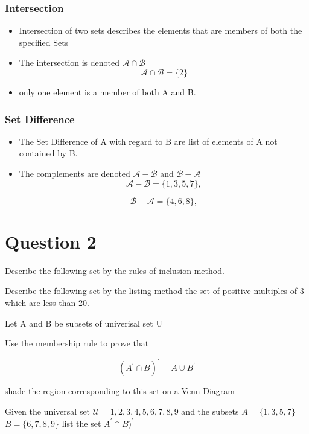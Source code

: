 
\subsubsection*{Intersection}
\begin{itemize}

\item Intersection of two sets describes the elements that are members of both the specified Sets

\item The intersection is denoted $\mathcal{A\cap B}$ 
\[ \mathcal{A\cap B} = \{2\}\]

\item only one element is a member of both A and B.
\end{itemize}

\subsubsection*{Set Difference}
\begin{itemize}

\item The Set Difference of A with regard to B are list of elements of A not contained by B.

\item The complements are denoted $\mathcal{A-B}$ and $\mathcal{B-A}$
\[ \mathcal{A-B} = \{1,3,5,7\}, \]

\[ \mathcal{B-A} = \{4,6,8\}, \]
\end{itemize}



\section*{Question 2}
Describe the following set by the rules of inclusion method.

Describe the following set by the listing method
the set of positive multiples of 3 which are less than 20.

Let A and B be subsets of univerisal set U

Use the membership rule to prove that

\[(A^\prime  \cap B)^\prime = A \cup B^\prime\]

shade the region corresponding to this set on a Venn Diagram

Given the universal set $\mathcal{U} = {1,2,3,4,5,6,7,8,9}$
and the subsets $A=\{1,3,5,7\}$
$B = \{6,7,8,9\}$
list the set $A^\prime \cap B)^\prime$ 



